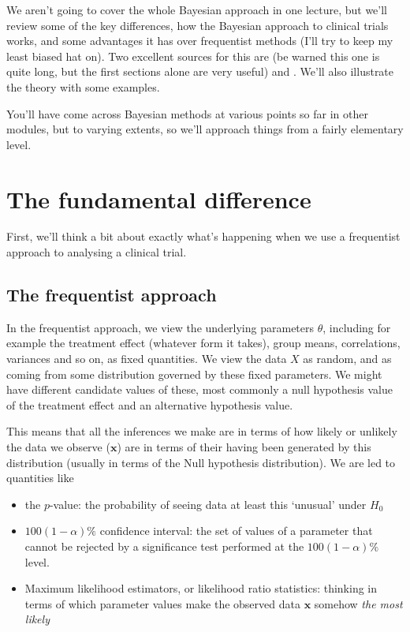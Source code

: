 \documentclass[
  openany]{book}
\providecommand{\tightlist}{%
  \setlength{\itemsep}{0pt}\setlength{\parskip}{0pt}}
\theoremstyle{definition}
\theoremstyle{definition}
\theoremstyle{definition}
\theoremstyle{definition}
\theoremstyle{remark}
\begin{document}
We aren't going to cover the whole Bayesian approach in one lecture, but we'll review some of the key differences, how the Bayesian approach to clinical trials works, and some advantages it has over frequentist methods (I'll try to keep my least biased hat on). Two excellent sources for this are \citet{spiegelhalter1994bayesian} (be warned this one is quite long, but the first sections alone are very useful) and \citet{berry2006bayesian}. We'll also illustrate the theory with some examples.

You'll have come across Bayesian methods at various points so far in other modules, but to varying extents, so we'll approach things from a fairly elementary level.

\hypertarget{the-fundamental-difference}{%
\section{The fundamental difference}\label{the-fundamental-difference}}

First, we'll think a bit about exactly what's happening when we use a frequentist approach to analysing a clinical trial.

\hypertarget{the-frequentist-approach}{%
\subsection*{The frequentist approach}\label{the-frequentist-approach}}

In the frequentist approach, we view the underlying parameters \(\theta\), including for example the treatment effect (whatever form it takes), group means, correlations, variances and so on, as fixed quantities. We view the data \(X\) as random, and as coming from some distribution governed by these fixed parameters. We might have different candidate values of these, most commonly a null hypothesis value of the treatment effect and an alternative hypothesis value.

This means that all the inferences we make are in terms of how likely or unlikely the data we observe (\(\mathbf{x}\)) are in terms of their having been generated by this distribution (usually in terms of the Null hypothesis distribution). We are led to quantities like

\begin{itemize}
\tightlist
\item
  the \(p\)-value: the probability of seeing data at least this `unusual' under \(H_0\)
\item
  \(100\left(1-\alpha\right)\%\) confidence interval: the set of values of a parameter that cannot be rejected by a significance test performed at the \(100\left(1-\alpha\right)\%\) level.
\item
  Maximum likelihood estimators, or likelihood ratio statistics: thinking in terms of which parameter values make the observed data \(\mathbf{x}\) somehow \emph{the most likely}
\end{itemize}
\end{document}
